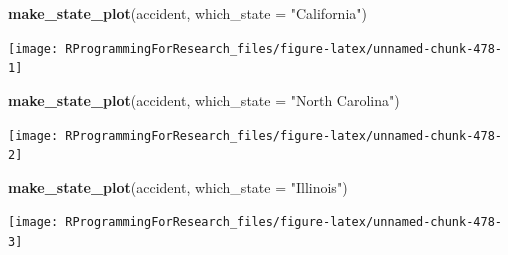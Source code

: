 \documentclass[]{book}
\makeatletter
\newenvironment{Shaded}{\begin{snugshade}}{\end{snugshade}}
\newcommand{\KeywordTok}[1]{\textcolor[rgb]{0.13,0.29,0.53}{\textbf{{#1}}}}
\newcommand{\DataTypeTok}[1]{\textcolor[rgb]{0.13,0.29,0.53}{{#1}}}
\newcommand{\StringTok}[1]{\textcolor[rgb]{0.31,0.60,0.02}{{#1}}}
\newcommand{\NormalTok}[1]{{#1}}
\newenvironment{kframe}{%
\medskip{}
\setlength{\fboxsep}{.8em}
 \def\at@end@of@kframe{}%
 \ifinner\ifhmode%
  \def\at@end@of@kframe{\end{minipage}}%
  \begin{minipage}{\columnwidth}%
 \fi\fi%
 \def\FrameCommand##1{\hskip\@totalleftmargin \hskip-\fboxsep
 \colorbox{shadecolor}{##1}\hskip-\fboxsep
     \hskip-\linewidth \hskip-\@totalleftmargin \hskip\columnwidth}%
 \MakeFramed {\advance\hsize-\width
   \@totalleftmargin\z@ \linewidth\hsize
   \@setminipage}}%
 {\par\unskip\endMakeFramed%
 \at@end@of@kframe}
\renewenvironment{Shaded}{\begin{kframe}}{\end{kframe}}
\makeatother
\begin{document}
\begin{Shaded}
\begin{Highlighting}[]
\KeywordTok{make_state_plot}\NormalTok{(accident, }\DataTypeTok{which_state =} \StringTok{"California"}\NormalTok{)}
\end{Highlighting}
\end{Shaded}

\begin{center}\texttt{[image: RProgrammingForResearch\_files/figure-latex/unnamed-chunk-478-1]} \end{center}

\begin{Shaded}
\begin{Highlighting}[]
\KeywordTok{make_state_plot}\NormalTok{(accident, }\DataTypeTok{which_state =} \StringTok{"North Carolina"}\NormalTok{)}
\end{Highlighting}
\end{Shaded}

\begin{center}\texttt{[image: RProgrammingForResearch\_files/figure-latex/unnamed-chunk-478-2]} \end{center}

\begin{Shaded}
\begin{Highlighting}[]
\KeywordTok{make_state_plot}\NormalTok{(accident, }\DataTypeTok{which_state =} \StringTok{"Illinois"}\NormalTok{)}
\end{Highlighting}
\end{Shaded}

\begin{center}\texttt{[image: RProgrammingForResearch\_files/figure-latex/unnamed-chunk-478-3]} \end{center}
\end{document}
